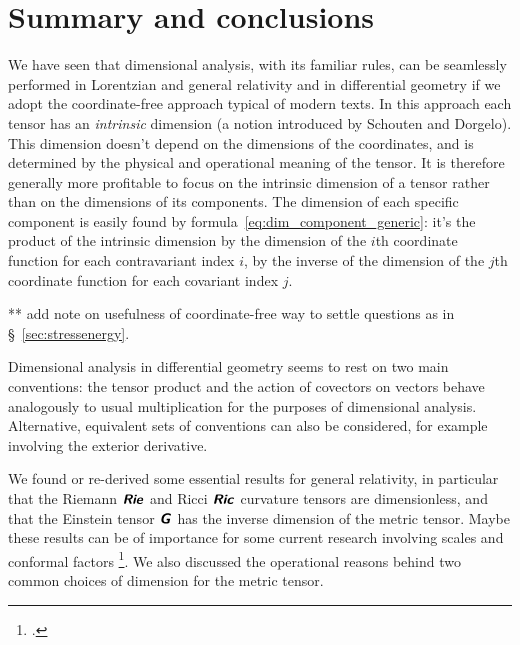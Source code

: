 \documentclass[\ifafour a4paper,12pt,\else a5paper,10pt,\fi%
onecolumn,oneside,article,%
british%
]{memoir}
\makeatletter
\theoremstyle{remark}
\theoremstyle{innote}
\newcommand*{\mathte}[1]{\textbf{\textit{\textsf{#1}}}}
\newcommand*{\citep}{\footcites}
\newcommand*{\defd}{\coloneqq}
\renewcommand*{\|}[1][]{\nonscript\,#1\vert\nonscript\;\mathopen{}}
\newcommand*{\sect}{\S}%
\newcommand*{\eg}{{e.g.}}
\newcommand*{\q}{}%
\DeclareRobustCommand*{\q}{%
  \mathbin{\mathpalette\bigcdot@{}}%
}
\newcommand*{\bigcdot@scalefactor}{0.7}
\newcommand*{\bigcdot@widthfactor}{1.5}
\newcommand*{\bigcdot@}[2]{%
  \sbox0{$#1\vcenter{}$}%
  \sbox2{$#1\cdot\m@th$}%
  \hbox to \bigcdot@widthfactor\wd2{%
    \hfil
    \raise\ht0\hbox{%
      \scalebox{\bigcdot@scalefactor}{%
        \lower\ht0\hbox{$#1\bullet\m@th$}%
      }%
    }%
    \hfil
  }%
}
\newcommand*{\Un}{\textsf{1}}
\newcommand*{\yg}{\mathte{g}}
\newcommand*{\yG}{\mathte{G}}
\newcommand*{\yR}{\mathte{Rie}}
\newcommand*{\yRi}{\mathte{Ric}}
\renewcommand*{\i}{\indices}
\makeatother
\begin{document}


\section{Summary and conclusions}
\label{sec:summary}

We have seen that dimensional analysis, with its familiar rules, can be
seamlessly performed in Lorentzian and general relativity and in
differential geometry if we adopt the coordinate-free approach typical of
modern texts. In this approach each tensor has an \emph{intrinsic}
dimension (a notion introduced by Schouten and Dorgelo). This dimension
doesn't depend on the dimensions of the coordinates, and is determined by
the physical and operational meaning of the tensor. It is therefore
generally more profitable to focus on the intrinsic dimension of a tensor
rather than on the dimensions of its components. The dimension of each
specific component is easily found by
formula~\eqref{eq:dim_component_generic}: it's the product of the intrinsic
dimension by the dimension of the $i$th coordinate function for each
contravariant index $i$, by the inverse of the dimension of the $j$th
coordinate function for each covariant index $j$.

** add note on usefulness of coordinate-free way to settle questions as in \sect~\ref{sec:stressenergy}.

Dimensional analysis in differential geometry seems to rest on two main
conventions: the tensor product and the action of covectors on vectors
behave analogously to usual multiplication for the purposes of dimensional
analysis. Alternative, equivalent sets of conventions can also be
considered, for example involving the exterior derivative.

We found or re-derived some essential results for general relativity, in
particular that the Riemann $\yR\i{^{\q}_{\q\q\q}}$ and Ricci
$\yRi\i{_{\q\q}}$ curvature tensors are dimensionless, and that the
Einstein tensor $\yG\i{_{\q}^{\q}}$ has the inverse dimension of the metric
tensor. Maybe these results can be of importance for some current research
involving scales and conformal factors
\citep[\eg][]{roehretal2005,cadonietal2019}. We also discussed the
operational reasons behind two common choices of dimension for the metric
tensor.
\end{document}
